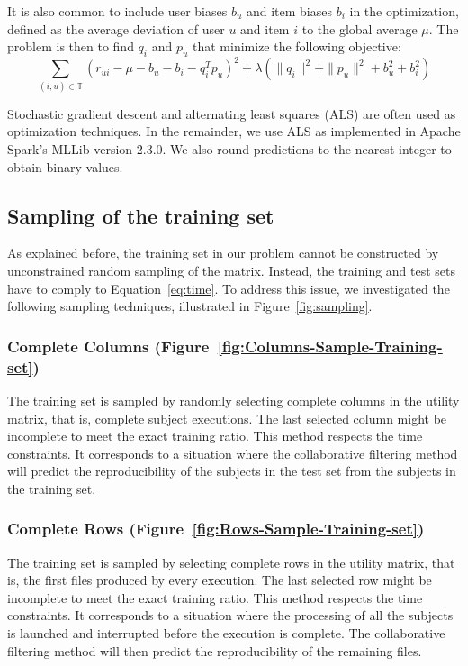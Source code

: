 \documentclass[10pt, conference, compsocconf]{IEEEtran}
\begin{document}
It is also common to include user biases $b_u$ and item biases $b_i$ in 
the optimization, defined as the average deviation of user $u$ and item 
$i$ to the global average $\mu$. The problem is then to find $q_i$ and $p_u$ that minimize the 
following objective:
\begin{equation*}
\sum_{(i,u) \in \mathbb{T}}\left( r_{ui} - \mu - b_u - b_i - q_i^Tp_u\right)^2+\lambda \left( \|{q_i}\|^2 + \|{p_u}\|^2 + b_u^2 + b_i^2\right)
\end{equation*}

Stochastic gradient descent and alternating least squares (ALS) are 
often used as optimization techniques. In the remainder, we use ALS as 
implemented in Apache Spark's MLLib version 2.3.0. We also round predictions 
to the nearest integer to obtain binary values.

\subsection{Sampling of the training set}

\label{sec:training}

As explained before, the training set in our problem cannot be 
constructed by unconstrained random sampling of the matrix. Instead, 
the training and test sets have to comply to Equation~\ref{eq:time}. To 
address this issue, we investigated the following sampling techniques, illustrated in
Figure~\ref{fig:sampling}. 

\subsubsection{Complete Columns 
(Figure~\ref{fig:Columns-Sample-Training-set})} The training set is 
sampled by randomly selecting complete columns in the utility matrix, 
that is, complete subject executions. The last selected column might be 
incomplete to meet the exact training ratio. This method respects the 
time constraints. It corresponds to a situation where the collaborative 
filtering method will predict the reproducibility of the subjects in 
the test set from the subjects in the training set. 

\subsubsection{Complete Rows (Figure~\ref{fig:Rows-Sample-Training-set})} 
The training set is sampled by selecting complete rows in the utility 
matrix, that is, the first files produced by every execution. The last 
selected row might be incomplete to meet the exact training ratio. This 
method respects the time constraints. It corresponds to a situation 
where the processing of all the subjects is launched and interrupted 
before the execution is complete. The collaborative filtering method 
will then predict the reproducibility of the remaining files.
\end{document}
